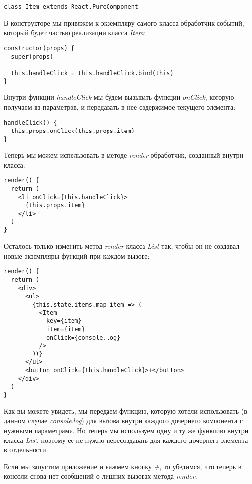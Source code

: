\begin{lstlisting}
class Item extends React.PureComponent	
\end{lstlisting}

В конструкторе мы привяжем к экземпляру самого класса обработчик событий, который будет частью реализации класса \textit{Item}:

\begin{lstlisting}
constructor(props) {
  super(props)
  
  this.handleClick = this.handleClick.bind(this)
}
\end{lstlisting} 

Внутри функции \textit{handleClick} мы будем вызывать функции \textit{onClick}, которую получаем из параметров, и передавать в нее содержимое текущего элемента:

\begin{lstlisting}
handleClick() {
  this.props.onClick(this.props.item)
}
\end{lstlisting}

Теперь мы можем использовать в методе \textit{render} обработчик, созданный внутри класса:

\begin{lstlisting}
render() {
  return (
    <li onClick={this.handleClick}>
      {this.props.item}
    </li>
  )
}
\end{lstlisting}

Осталось только изменить метод \textit{render} класса \textit{List} так, чтобы он не создавал новые экземпляры функций при каждом вызове:

\begin{lstlisting}
render() {
  return (
    <div>
      <ul>
        {this.state.items.map(item => (
          <Item
            key={item}
            item={item}
            onClick={console.log}
          />
        ))}
      </ul>
      <button onClick={this.handleClick}>+</button>
    </div>
  )
}
\end{lstlisting}

Как вы можете увидеть, мы передаем функцию, которую хотели использовать (в данном случае \textit{console.log}) для вызова внутри каждого дочернего компонента с нужными параметрами. Но теперь мы используем одну и ту же функцию внутри класса \textit{List}, поэтому ее не нужно пересоздавать для каждого дочернего элемента в отдельности.

Если мы запустим приложение и нажмем кнопку \textit{+}, то убедимся, что теперь в консоли снова нет сообщений о лишних вызовах метода \textit{render}.

